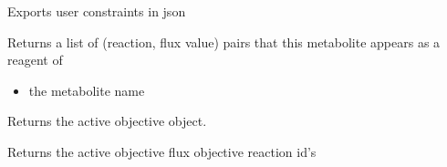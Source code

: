 \documentclass[letterpaper,10pt,english]{sphinxmanual}
\begin{document}
\begin{fulllineitems}
\begin{fulllineitems}
\end{fulllineitems}


\begin{fulllineitems}
\label{\detokenize{modules_doc:cbmpy.CBModel.Model.exportUserConstraints}}
\pysigstartsignatures
{}
\pysigstopsignatures
\sphinxAtStartPar
Exports user constraints in json

\end{fulllineitems}


\begin{fulllineitems}
\label{\detokenize{modules_doc:cbmpy.CBModel.Model.findFluxesForConnectedSpecies}}
\pysigstartsignatures
{}
\pysigstopsignatures
\sphinxAtStartPar
Returns a list of (reaction, flux value) pairs that this metabolite appears as a reagent of
\begin{itemize}
\item {} 
\sphinxAtStartPar
{} the metabolite name

\end{itemize}

\end{fulllineitems}


\begin{fulllineitems}
\label{\detokenize{modules_doc:cbmpy.CBModel.Model.getActiveObjective}}
\pysigstartsignatures
{}
\pysigstopsignatures
\sphinxAtStartPar
Returns the active objective object.

\end{fulllineitems}


\begin{fulllineitems}
\label{\detokenize{modules_doc:cbmpy.CBModel.Model.getActiveObjectiveReactionIds}}
\pysigstartsignatures
{}
\pysigstopsignatures
\sphinxAtStartPar
Returns the active objective flux objective reaction id’s


\end{fulllineitems}
\end{fulllineitems}
\end{document}
